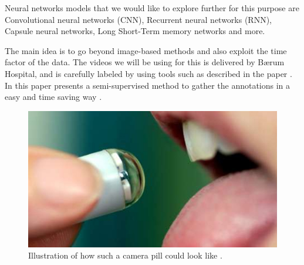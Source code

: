 \documentclass[english, a4paper]{article}
\begin{document}
Neural networks models that we would like to explore further for this purpose are Convolutional neural networks (CNN), Recurrent neural networks (RNN), Capsule neural networks, Long Short-Term memory networks and more.

The main idea is to go beyond image-based methods and also exploit the time factor of the data. 
The videos we will be using for this is delivered by Bærum Hospital, and is carefully labeled by using tools such as described in the paper . In this paper \citeauthor*{ExpertDriven15} presents a semi-supervised method to gather the annotations in a easy and time saving way \cite{ExpertDriven15}. 

\begin{figure}[H] %
  \begin{center}
    \includegraphics[width=\linewidth]{pill-cam.jpg}
    \caption{Illustration of how such a camera pill could look like \cite{PillCamCamera}.}
    \label{fig:pill-cam}
  \end{center}
\end{figure}
\end{document}
